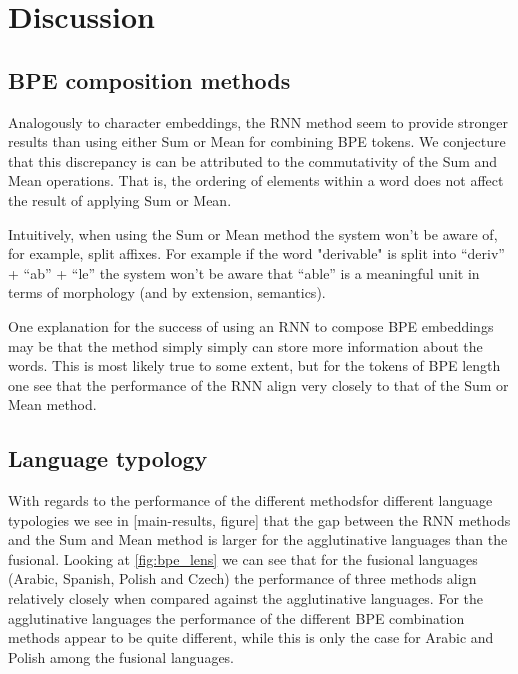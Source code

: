 \documentclass[11pt]{article}
\newcommand\jp[1]{(\textbf{JP:} #1)}
\begin{document}
	
	
	\section{Discussion}

    \subsection{BPE composition methods}
     Analogously to character embeddings, the RNN method seem
     to provide stronger results than using either Sum or Mean for
     combining BPE tokens. We conjecture that this discrepancy is can
     be attributed to the commutativity of the Sum and Mean
     operations. That is, the ordering of elements within a word does
     not affect the result of applying Sum or Mean.

     Intuitively, when using the Sum or Mean method the system won't
     be aware of, for example, split affixes. For example if the word
     "derivable" is split into ``deriv'' + ``ab'' + ``le'' the system
     won't be aware that ``able'' is a meaningful unit in terms of
     morphology (and by extension, semantics).


     One explanation for the success of using an RNN to compose BPE
     embeddings may be that the method simply simply can store more
     information about the words. This is most likely true to some
     extent, but for the tokens of BPE length one see that the
     performance of the RNN align very closely to that of the Sum or
     Mean method.

    \subsection{Language typology}

            With regards to the performance of the different
     methodsfor different language typologies we see in [main-results,
     figure] that the gap between the RNN methods and the Sum and Mean
     method is larger for the agglutinative languages than the
     fusional.  Looking at \cref{fig:bpe_lens} we can see that for the
     fusional languages (Arabic, Spanish, Polish and Czech) the
     performance of three methods align relatively closely when
     compared against the agglutinative languages. For the
     agglutinative languages the performance of the different BPE
     combination methods appear to be quite different, while this is
     only the case for Arabic and Polish among the fusional languages.
\end{document}
